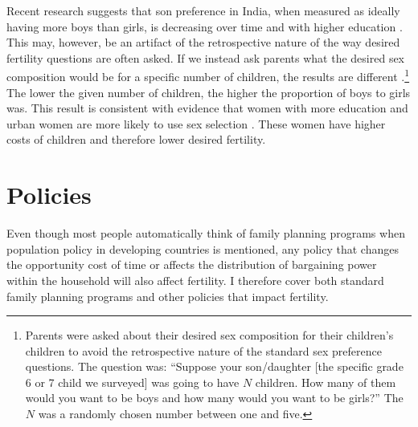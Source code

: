Recent research suggests that son preference in India, when measured as ideally having more boys than girls, is decreasing over time and with higher education \citep{bhat03,pande07}. This may, however, be an artifact of the retrospective nature of the way desired fertility questions are often asked. If we instead ask parents what the desired sex composition would be for a specific number of children, the results are different \citep{Jayachandran2017}.\footnote{Parents were asked about their desired sex composition for their children's children to avoid the retrospective nature of the standard sex preference questions. The question was: ``Suppose your son/daughter {[}the specific grade 6 or 7 child we surveyed{]} was going to have \(N\) children. How many of them would you want to be boys and how many would you want to be girls?'' The \(N\) was a randomly chosen number between one and five.} The lower the given number of children, the higher the proportion of boys to girls was. This result is consistent with evidence that women with more education and urban women are more likely to use sex selection \citep{Portner2015b}. These women have higher costs of children and therefore lower desired fertility.

\section{Policies}\label{policies}

Even though most people automatically think of family planning programs when population policy in developing countries is mentioned, any policy that changes the opportunity cost of time or affects the distribution of bargaining power within the household will also affect fertility. I therefore cover both standard family planning programs and other policies that impact fertility.

